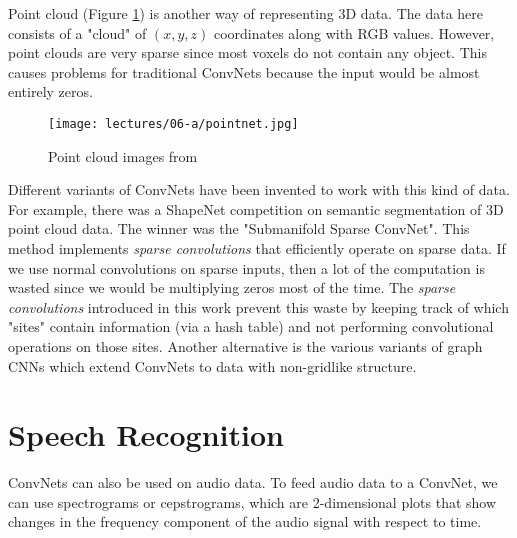 Point cloud (Figure \ref{fig:pointcloud}) is another way of representing 3D data. The data here consists of a "cloud" of $(x,y,z)$  coordinates along with RGB values. However, point clouds are very sparse since most voxels do not contain any object. This causes problems for traditional ConvNets because the input would be almost entirely zeros.

\begin{figure}[ht]
    \centering
    \texttt{[image: lectures/06-a/pointnet.jpg]}
    \caption{Point cloud images from \citep{qi2017pointnet}}
    \label{fig:pointcloud}
\end{figure}
Different variants of ConvNets have been invented to work with this kind of data. For example, there was a ShapeNet competition on semantic segmentation of 3D point cloud data.
The winner was the "Submanifold Sparse ConvNet". This method implements {\it sparse convolutions} that efficiently operate on sparse data. If we use normal convolutions on sparse inputs, then a lot of the computation is wasted since we would be multiplying zeros most of the time. The {\it sparse convolutions} introduced in this work prevent this waste by keeping track of which "sites" contain information (via a hash table) and not performing convolutional operations on those sites. Another alternative is the various variants of graph CNNs which extend ConvNets to data with non-gridlike structure.

\section{Speech Recognition}
ConvNets can also be used on audio data. To feed audio data to a ConvNet, we can use spectrograms or cepstrograms, which are 2-dimensional plots that show changes in the frequency component of the audio signal with respect to time.

